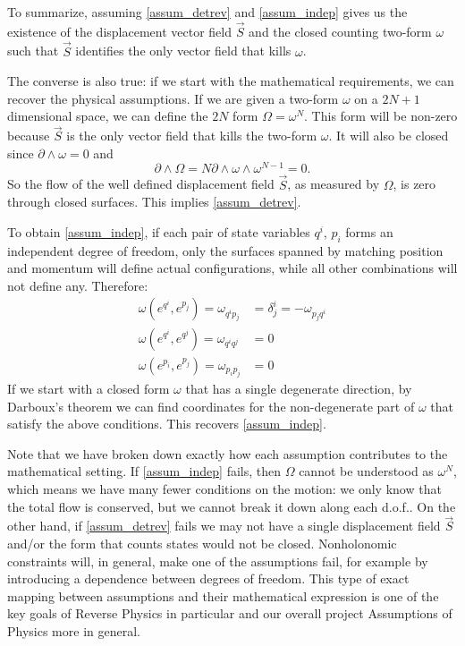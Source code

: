 \documentclass[fleqn,10pt]{wlscirep}
\begin{document}
To summarize, assuming \ref{assum_detrev} and \ref{assum_indep} gives us the existence of the displacement vector field $\vec{S}$ and the closed counting two-form $\omega$ such that $\vec{S}$ identifies the only vector field that kills $\omega$.

The converse is also true: if we start with the mathematical requirements, we can recover the physical assumptions. If we are given a two-form $\omega$ on a $2N+1$ dimensional space, we can define the $2N$ form $\Omega = \omega^N$. This form will be non-zero because $\vec{S}$ is the only vector field that kills the two-form $\omega$. It will also be closed since $\partial \wedge \omega = 0$ and
\begin{equation}
	\partial \wedge \Omega = N\partial \wedge \omega \wedge \omega^{N-1} = 0.
\end{equation}
So the flow of the well defined displacement field $\vec{S}$, as measured by $\Omega$, is zero through closed surfaces. This implies \ref{assum_detrev}.

To obtain \ref{assum_indep}, if each pair of state variables $q^i$, $p_i$ forms an independent degree of freedom, only the surfaces spanned by matching position and momentum will define actual configurations, while all other combinations will not define any. Therefore:
\begin{equation}\label{canonical_conditions}
	\begin{aligned}
		\omega(e^{q^i}, e^{p_j}) = \omega_{q^i p_j} &= \delta^i_j = - \omega_{p_j q^i} \\
		\omega(e^{q^i}, e^{q^j}) = \omega_{q^i q^j} &= 0 \\
		\omega(e^{p_i}, e^{p_j}) = \omega_{p_i p_j} &= 0
	\end{aligned}
\end{equation}
If we start with a closed form $\omega$ that has a single degenerate direction, by Darboux's theorem we can find coordinates for the non-degenerate part of $\omega$ that satisfy the above conditions. This recovers \ref{assum_indep}.

Note that we have broken down exactly how each assumption contributes to the mathematical setting. If \ref{assum_indep} fails, then $\Omega$ cannot be understood as $\omega^N$, which means we have many fewer conditions on the motion: we only know that the total flow is conserved, but we cannot break it down along each d.o.f.. On the other hand, if \ref{assum_detrev} fails we may not have a single displacement field $\vec{S}$ and/or the form that counts states would not be closed. Nonholonomic constraints will, in general, make one of the assumptions fail, for example by introducing a dependence between degrees of freedom. This type of exact mapping between assumptions and their mathematical expression is one of the key goals of Reverse Physics in particular and our overall project Assumptions of Physics more in general.
\end{document}
